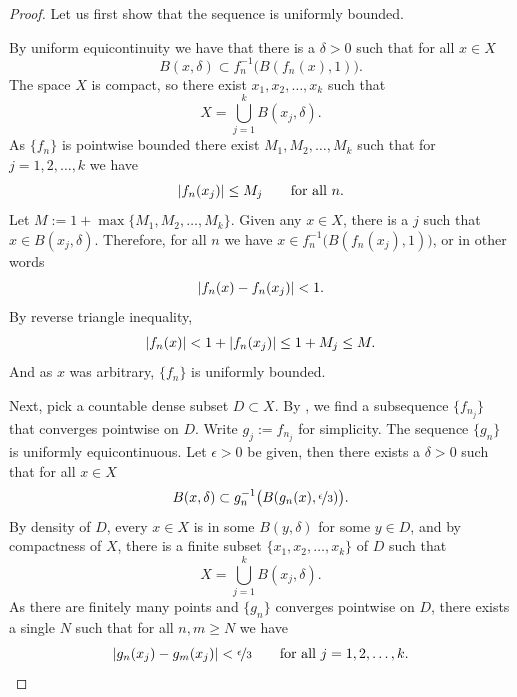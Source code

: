 \begin{proof}
Let us first show that the sequence is uniformly bounded.

By uniform equicontinuity we have that
there is a $\delta > 0$
such that
for all $x \in X$
\begin{equation*}
B(x,\delta) \subset f_n^{-1}\bigl(B(f_n(x),1)\bigr) .
\end{equation*}
The space $X$ is compact, so there exist $x_1,x_2,\ldots,x_k$
such that
\begin{equation*}
X = \bigcup_{j=1}^k B(x_j,\delta) .
\end{equation*}
As $\{ f_n \}$ is pointwise bounded there exist $M_1,M_2,\ldots,M_k$
such that for $j=1,2,\ldots,k$ we have
\begin{equation*}
\lvert {f_n(x_j)} \rvert \leq M_j \qquad \text{for all $n$.}
\end{equation*}
Let $M := 1+ \max \{ M_1,M_2,\ldots,M_k \}$.  Given any
$x \in X$, there is a $j$ such that $x \in B(x_j,\delta)$.  Therefore,
for all $n$ we have
$x \in f_n^{-1}\bigl(B(f_n(x_j),1)\bigr)$, or in other words
\begin{equation*}
\lvert {f_n(x)-f_n(x_j)} \rvert < 1 .
\end{equation*}
By reverse triangle inequality,
\begin{equation*}
\lvert {f_n(x)} \rvert < 1+ \lvert {f_n(x_j)} \rvert \leq 1+M_j \leq M .
\end{equation*}
And as $x$ was arbitrary, $\{f_n\}$ is uniformly bounded.


Next, pick a countable dense subset $D \subset X$.
By , we find
a subsequence $\{ f_{n_j} \}$ that converges pointwise on $D$.
Write $g_j := f_{n_j}$ for simplicity.
The sequence $\{ g_n \}$ is 
uniformly equicontinuous.
Let $\epsilon > 0$ be given, then there exists a $\delta > 0$
such that for all $x \in X$
\begin{equation*}
B(x,\delta) \subset g_n^{-1}\bigl(B(g_n(x),\nicefrac{\epsilon}{3})\bigr).
\end{equation*}
By density of $D$, every $x \in X$ is in some $B(y,\delta)$
for some $y \in D$, and by compactness of $X$,
there is a finite subset $\{ x_1,x_2,\ldots,x_k \}$ of $D$
such that
\begin{equation*}
X = \bigcup_{j=1}^k B(x_j,\delta) .
\end{equation*}
As there are finitely many points and $\{ g_n \}$
converges pointwise on $D$, there exists a single $N$ such that for 
all $n,m \geq N$ we have
\begin{equation*}
\lvert {g_n(x_j)-g_m(x_j)} \rvert < \nicefrac{\epsilon}{3}
 \qquad \text{for all $j=1,2,\ldots,k$.}
\end{equation*}


\end{proof}
